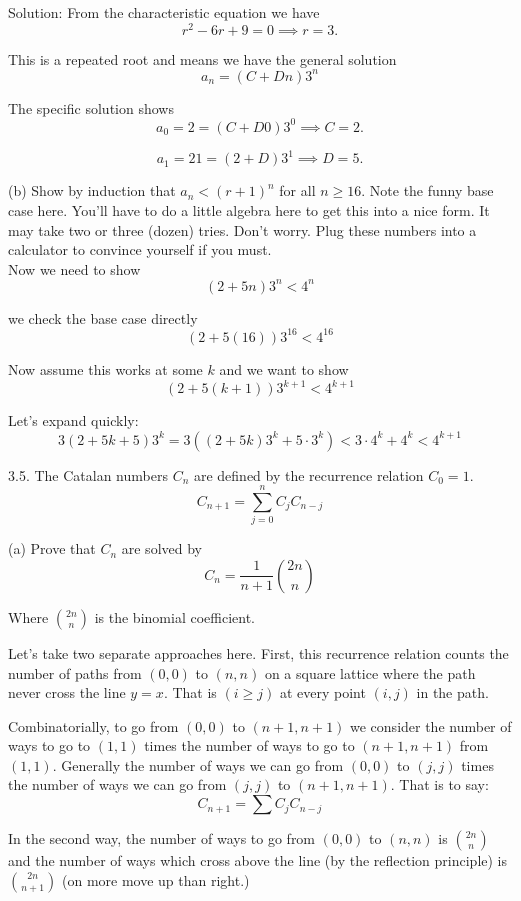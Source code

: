 \documentclass[16 pt]{amsart}
\theoremstyle{definition}
\theoremstyle{remark}
\numberwithin{equation}{subsection}
\begin{document}
Solution: From the characteristic equation we have 
\[
r^2 - 6r + 9 = 0 \implies r= 3.
\]

This is a repeated root and means we have the general solution
\[
a_n = (C+Dn)3^n
\]

The specific solution shows
\[
a_0 = 2 = (C+D0)3^0 \implies C = 2.
\]

\[
a_1 = 21 = (2+D)3^1 \implies D=5.
\]





(b) Show by induction that $a_n < (r+1)^n$ for all $n\ge 16$.  Note the funny base case here.  You'll have to do a little algebra here to get this into a nice form.  It may take two or three (dozen) tries.  Don't worry.  Plug these numbers into a calculator to convince yourself if you must.\\


Now we need to show
\[
(2+5n)3^n < 4^n
\]

we check the base case directly
\[
(2+5(16))3^{16} < 4^{16}
\]

Now assume this works at some $k$ and we want to show
\[
(2+5(k+1))3^{k+1} < 4^{k+1}
\]

Let's expand quickly:
\[
3(2+5k + 5)3^k = 3((2+5k)3^k + 5\cdot 3^k)<3\cdot 4^k + 4^k < 4^{k+1}
\]



3.5.  The Catalan numbers $C_n$ are defined by the recurrence relation $C_0=1$.
\[
C_{n+1} = \sum_{j=0}^{n} C_j C_{n-j}
\]

(a) Prove that $C_n$ are solved by
\[
C_n = \frac{1}{n+1}\binom{2n}{n}
\]

Where $\binom{2n}{n}$ is the binomial coefficient.

Let's take two separate approaches here.  First, this recurrence relation counts the number of paths from $(0,0)$ to $(n,n)$ on a square lattice where the path never cross the line $y=x$.  That is $(i\ge j)$ at every point $(i,j)$ in the path.

Combinatorially, to go from $(0,0)$ to $(n+1,n+1)$ we consider the number of ways to go to $(1,1)$ times the number of ways to go to $(n+1,n+1)$ from $(1,1)$.  Generally the number of ways we can go from $(0,0)$ to $(j,j)$ times the number of ways we can go from $(j,j)$ to $(n+1,n+1)$.  That is to say:
\[
C_{n+1} = \sum C_j C_{n-j}
\]

In the second way, the number of ways to go from $(0,0)$ to $(n,n)$ is $\binom{2n}{n}$ and the number of ways which cross above the line (by the reflection principle) is $\binom{2n}{n+1}$ (on more move up than right.)
\end{document}
